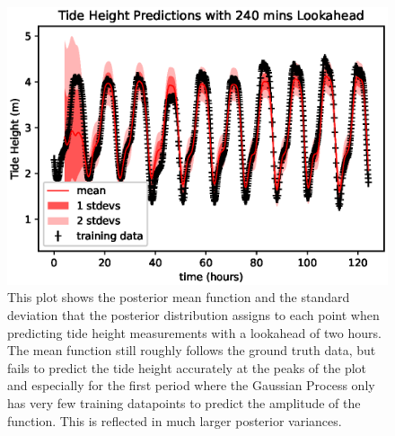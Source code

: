 \documentclass{article}
\begin{document}
                \begin{figure}[h!]
                    \includegraphics[width=\linewidth,height=\textheight,keepaspectratio]{tide_height_lookahead_240mins.eps}
                    \caption{This plot shows the posterior mean function and the standard deviation that the posterior distribution assigns to each point when predicting tide height measurements with a lookahead of two hours. The mean function still roughly follows the ground truth data, but fails to predict the tide height accurately at the peaks of the plot and especially for the first period where the Gaussian Process only has very few training datapoints to predict the amplitude of the function. This is reflected in much larger posterior variances.}
                    \label{plot_tideheightlookahead_240mins}
                \end{figure}
\end{document}
